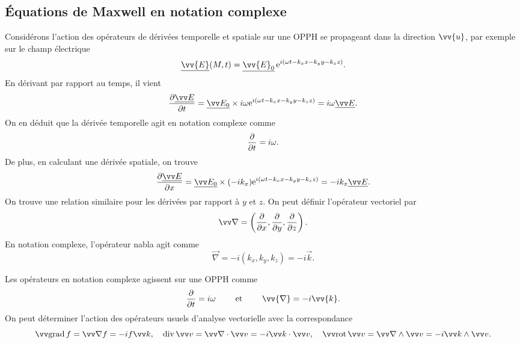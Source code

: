 \documentclass[12pt,fancy]{cours}
\begin{document}
\subsection{Équations de Maxwell en notation complexe}


Considérons l'action des opérateurs de dérivées temporelle et spatiale sur une OPPH se propageant dans la direction $\vv{u}$, par exemple sur le champ électrique 
$$
\udl{\vv{E}}(M,t)=\udl{\vv{E}_0}\,\e^{i(\omega t-k_x x - k_y y - k_z z)}.
$$
En dérivant par rapport au temps, il vient
$$
\dr{\udl{\E}}{t} = \udl{\Vec{E_0}}\times i \omega \e^{i(\omega t-k_x x - k_y y - k_z z)} = i\omega \udl{\E}.
$$
On en déduit que la dérivée temporelle agit en notation complexe comme
$$
\frac{\partial{}}{\partial{t}} = i\omega.
$$
De plus, en calculant une dérivée spatiale, on trouve
$$
\dr{\udl{\E}}{x} =  \udl{\Vec{E_0}}\times (-i k_x) \e^{i(\omega t-k_x x - k_y y - k_z z)} = -ik_x \udl{\Vec{E}}.
$$
On trouve une relation similaire pour les dérivées par rapport à $y$ et $z$.
On peut définir l'opérateur vectoriel  par
$$
\Vec{\nabla} = \left(\dr{}{x},\dr{}{y},\dr{}{z} \right).
$$
En notation complexe, l'opérateur nabla agit comme
$$
\Vec{\nabla} = - i (k_x,k_y,k_z) = - i\Vec{k}.
$$


\begin{prop}\label{prop:}
  Les opérateurs en notation complexe agissent sur une OPPH comme
  \begin{equation*}
  \frac{\partial}{\partial t} =  i\omega \qquad\text{ et }\qquad
  \vv{\nabla} = -i\vv{k}.
  \end{equation*}
  On peut déterminer l'action des opérateurs usuels d'analyse vectorielle avec la correspondance
$$
\grad f= \Vec{\nabla} f = - if \Vec{k},  \quad \dive \Vec{v} = \Vec{\nabla} \ps \Vec{v} = - i \Vec{k} \ps \Vec{v}, \quad \rot \Vec{v} = \Vec{\nabla} \pv \Vec{v} = - i \Vec{k} \pv \Vec{v}.
$$
\end{prop}
\end{document}
